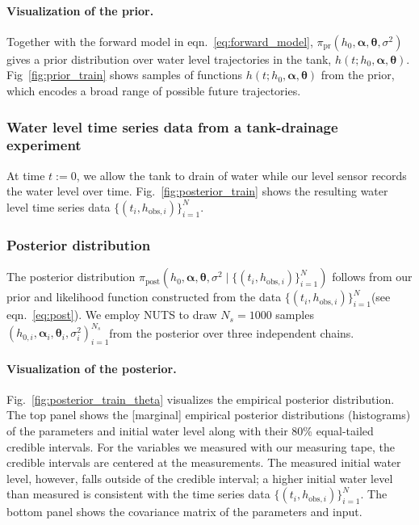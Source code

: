 \documentclass[openacc]{rsproca_new}%
\newcommand\thedata {$\{(t_i,h_{\text{obs}, i})\}_{i=1}^{N}$\xspace}
\newcommand\thedatanomath {\{(t_i,h_{\text{obs}, i})\}_{i=1}^{N}}
\newcommand\themodel {$h(t; h_0, \boldsymbol \alpha, \boldsymbol\theta)$\xspace}
\newcommand\thesamples{$(h_{0, i}, \boldsymbol \alpha_i, \boldsymbol \theta_i, \sigma_i^2)_{i=1}^{N_s}$}
\begin{document}
\paragraph{Visualization of the prior.}
Together with the forward model in eqn.~\ref{eq:forward_model}, $\pi_{\text{pr}}(h_0, \boldsymbol \alpha, \boldsymbol \theta, \sigma^2)$ gives a prior distribution over water level trajectories in the tank, \themodel. 
Fig~\ref{fig:prior_train} shows samples of functions \themodel from the prior, which encodes a broad range of possible future trajectories. 

\subsubsection{Water level time series data from a tank-drainage experiment} At time $t:=0$, we allow the tank to drain of water while our level sensor records the water level over time. 
Fig.~\ref{fig:posterior_train} shows the resulting water level time series data \thedata.

\subsubsection{Posterior distribution}
The posterior distribution $\pi_{\text{post}}(h_0, \boldsymbol \alpha, \boldsymbol \theta, \sigma^2 \mid \thedatanomath)$ follows from our prior and likelihood function constructed from the data \thedata (see eqn.~\ref{eq:post}). 
We employ NUTS to draw $N_s=1000$ samples \thesamples from the posterior over three independent chains. 


\paragraph{Visualization of the posterior.}Fig.~\ref{fig:posterior_train_theta} visualizes the empirical posterior distribution. 
The top panel shows the [marginal] empirical posterior distributions (histograms) of the parameters and initial water level along with their 80\% equal-tailed credible intervals. 
For the variables we measured with our measuring tape, the credible intervals are centered at the measurements. 
The measured initial water level, however, falls outside of the credible interval; a higher initial water level than measured is consistent with the time series data \thedata.
The bottom panel shows the covariance matrix of the parameters and input. 

\end{document}
